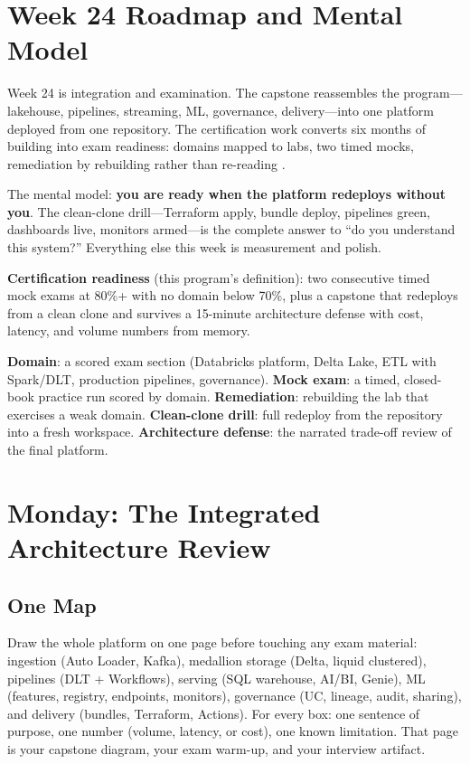\section{Week 24 Roadmap and Mental Model}
Week 24 is integration and examination. The capstone reassembles the program---lakehouse, pipelines, streaming, ML, governance, delivery---into one platform deployed from one repository. The certification work converts six months of building into exam readiness: domains mapped to labs, two timed mocks, remediation by rebuilding rather than re-reading \cite{databricksCertification}.

The mental model: \textbf{you are ready when the platform redeploys without you}. The clean-clone drill---Terraform apply, bundle deploy, pipelines green, dashboards live, monitors armed---is the complete answer to ``do you understand this system?'' Everything else this week is measurement and polish.

\begin{definitionbox}
\textbf{Certification readiness} (this program's definition): two consecutive timed mock exams at 80\%+ with no domain below 70\%, plus a capstone that redeploys from a clean clone and survives a 15-minute architecture defense with cost, latency, and volume numbers from memory.
\end{definitionbox}

\begin{keyterms}
\textbf{Domain}: a scored exam section (Databricks platform, Delta Lake, ETL with Spark/DLT, production pipelines, governance). \textbf{Mock exam}: a timed, closed-book practice run scored by domain. \textbf{Remediation}: rebuilding the lab that exercises a weak domain. \textbf{Clean-clone drill}: full redeploy from the repository into a fresh workspace. \textbf{Architecture defense}: the narrated trade-off review of the final platform.
\end{keyterms}

\section{Monday: The Integrated Architecture Review}
\subsection{One Map}
Draw the whole platform on one page before touching any exam material: ingestion (Auto Loader, Kafka), medallion storage (Delta, liquid clustered), pipelines (DLT + Workflows), serving (SQL warehouse, AI/BI, Genie), ML (features, registry, endpoints, monitors), governance (UC, lineage, audit, sharing), and delivery (bundles, Terraform, Actions). For every box: one sentence of purpose, one number (volume, latency, or cost), one known limitation. That page is your capstone diagram, your exam warm-up, and your interview artifact.

